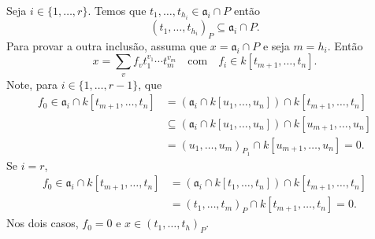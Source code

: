 \documentclass[12pt]{amsart}
\renewcommand{\a}{\mathfrak a}
\begin{document}
Seja $i\in\{1,\ldots,r\}$. Temos que $t_1,\ldots,t_{h_i}\in\a_i\cap P$ então 
\[ 
    (t_1,\ldots,t_{h_i})_P\subseteq \a_i\cap P.
\] 
Para provar a outra inclusão, 
assuma que $x=\a_i\cap P$ e seja $m=h_i$. Então 
\[
    x=\sum_v f_vt_1^{v_1}\cdots t_m^{v_m}\quad\mbox{com}\quad f_i\in k[t_{m+1},\ldots,t_n].
\] 
Note, para $i\in\{1,\ldots,r-1\}$, que
\begin{align*}
    f_0\in\a_i\cap k[t_{m+1},\ldots,t_n]&=
    (\a_i\cap k[u_1,\ldots,u_n])\cap k[t_{m+1},\ldots,t_n]\\
    &\subseteq (\a_i\cap k[u_1,\ldots,u_n])\cap k[u_{m+1},\ldots,u_n]\\& 
    =(u_1,\ldots,u_m)_{P_1}\cap k[u_{m+1},\ldots,u_n]=0.
\end{align*}
Se $i=r$,  
\begin{align*}
    f_0\in\a_i\cap k[t_{m+1},\ldots,t_n]&=(\a_i\cap k[t_1,\ldots,t_n])\cap k[t_{m+1},\ldots,t_n]\\
    &=(t_1,\ldots,t_m)_{P}\cap k[t_{m+1},\ldots,t_n]=0.
\end{align*}
Nos dois casos, $f_0=0$ e $x\in (t_1,\ldots,t_h)_P$. 
\end{document}
